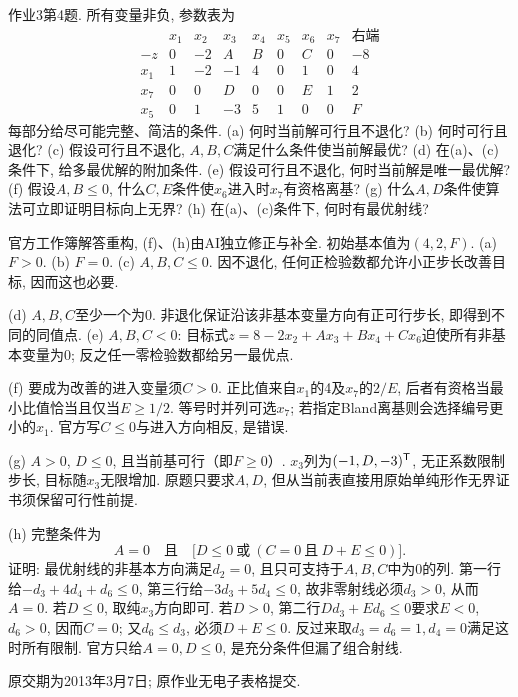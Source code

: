 \begin{exercise}\label{ass:15053-ps3-q4}
作业3第4题. 所有变量非负, 参数表为
\[
\begin{array}{c|rrrrrrr|r}
 &x_1&x_2&x_3&x_4&x_5&x_6&x_7&\text{右端}\\\hline
-z&0&-2&A&B&0&C&0&-8\\
x_1&1&-2&-1&4&0&1&0&4\\
x_7&0&0&D&0&0&E&1&2\\
x_5&0&1&-3&5&1&0&0&F
\end{array}
\]
每部分给尽可能完整、简洁的条件. (a) 何时当前解可行且不退化? (b) 何时可行且退化? (c) 假设可行且不退化, $A,B,C$满足什么条件使当前解最优? (d) 在(a)、(c)条件下, 给多最优解的附加条件. (e) 假设可行且不退化, 何时当前解是唯一最优解? (f) 假设$A,B\le0$, 什么$C,E$条件使$x_6$进入时$x_7$有资格离基? (g) 什么$A,D$条件使算法可立即证明目标向上无界? (h) 在(a)、(c)条件下, 何时有最优射线?
\end{exercise}
\begin{solution}
官方工作簿解答重构, (f)、(h)由AI独立修正与补全. 初始基本值为$(4,2,F)$. (a) $F>0$. (b) $F=0$. (c) $A,B,C\le0$. 因不退化, 任何正检验数都允许小正步长改善目标, 因而这也必要.

(d) $A,B,C$至少一个为0. 非退化保证沿该非基本变量方向有正可行步长, 即得到不同的同值点. (e) $A,B,C<0$: 目标式$z=8-2x_2+Ax_3+Bx_4+Cx_6$迫使所有非基本变量为0; 反之任一零检验数都给另一最优点.

(f) 要成为改善的进入变量须$C>0$. 正比值来自$x_1$的4及$x_7$的$2/E$, 后者有资格当最小比值恰当且仅当$E\ge1/2$. 等号时并列可选$x_7$; 若指定Bland离基则会选择编号更小的$x_1$. 官方写$C\le0$与进入方向相反, 是错误.

(g) $A>0$, $D\le0$, 且当前基可行（即$F\ge0$）. $x_3$列为$(-1,D,-3)^{\mathsf T}$, 无正系数限制步长, 目标随$x_3$无限增加. 原题只要求$A,D$, 但从当前表直接用原始单纯形作无界证书须保留可行性前提.

(h) 完整条件为
\[
A=0\quad\text{且}\quad\bigl[D\le0\ \text{或}\ (C=0\ \text{且}\ D+E\le0)\bigr].
\]
证明: 最优射线的非基本方向满足$d_2=0$, 且只可支持于$A,B,C$中为0的列. 第一行给$-d_3+4d_4+d_6\le0$, 第三行给$-3d_3+5d_4\le0$, 故非零射线必须$d_3>0$, 从而$A=0$. 若$D\le0$, 取纯$x_3$方向即可. 若$D>0$, 第二行$Dd_3+Ed_6\le0$要求$E<0$, $d_6>0$, 因而$C=0$; 又$d_6\le d_3$, 必须$D+E\le0$. 反过来取$d_3=d_6=1,d_4=0$满足这时所有限制. 官方只给$A=0,D\le0$, 是充分条件但漏了组合射线.
\end{solution}

原交期为2013年3月7日; 原作业无电子表格提交.

